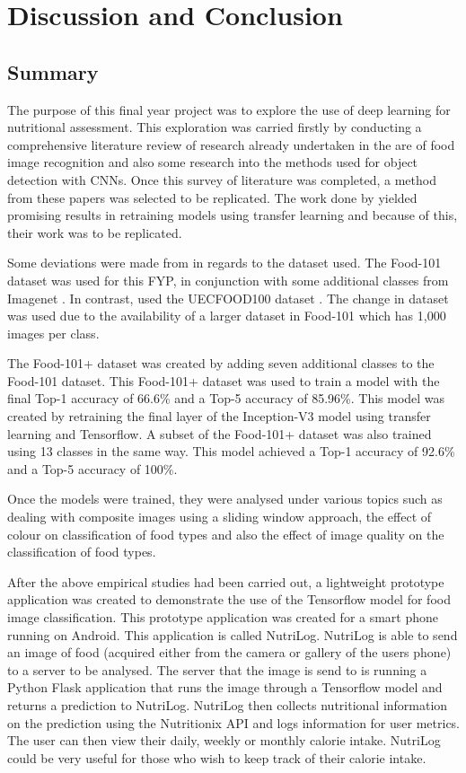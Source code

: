 \chapter{Discussion and Conclusion}
\section{Summary}
The purpose of this final year project was to explore the use of deep learning for nutritional assessment.
This exploration was carried firstly by conducting a comprehensive literature review of research already undertaken in the are of food image recognition and also some research into the methods used for object detection with CNNs.
Once this survey of literature was completed, a method from these papers was selected to be replicated.
The work done by \parencite{yanaiFood} yielded promising results in retraining models using transfer learning and because of this, their work was to be replicated.

Some deviations were made from \parencite{yanaiFood} in regards to the dataset used.
The Food-101 dataset was used for this FYP, in conjunction with some additional classes from Imagenet \parencite{imagenet}.
In contrast, \parencite{yanaiFood} used the UECFOOD100 dataset \parencite{uecFood}.
The change in dataset was used due to the availability of a larger dataset in Food-101 which has 1,000 images per class.

The Food-101+ dataset was created by adding seven additional classes to the Food-101 dataset.
This Food-101+ dataset was used to train a model with the final Top-1 accuracy of 66.6\% and a Top-5 accuracy of  85.96\%.
This model was created by retraining the final layer of the Inception-V3 \parencite{rethinkingInception} model using transfer learning and Tensorflow.
A subset of the Food-101+ dataset was also trained using 13 classes in the same way.
This model achieved a Top-1 accuracy of 92.6\% and a Top-5 accuracy of 100\%.

Once the models were trained, they were analysed under various topics such as
dealing with composite images using a sliding window approach, the effect of colour on classification of food types and also the effect of image quality on the classification of food types.

After the above empirical studies had been carried out, a lightweight prototype application was created to demonstrate the use of the Tensorflow model for food image classification.
This prototype application was created for a smart phone running on Android.
This application is called NutriLog.
NutriLog is able to send an image of food (acquired either from the camera or gallery of the users phone) to a server to be analysed.
The server that the image is send to is running a Python Flask application that runs the image through a Tensorflow model and returns a prediction to NutriLog.
NutriLog then collects nutritional information on the prediction using the Nutritionix API and logs information for user metrics.
The user can then view their daily, weekly or monthly calorie intake.
NutriLog could be very useful for those who wish to keep track of their calorie intake.

